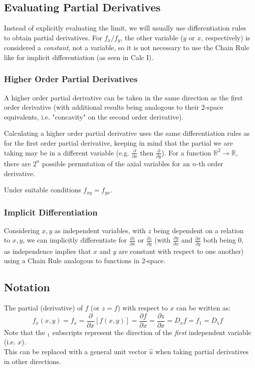 \documentclass{article}
\begin{document}
\subsection{Evaluating Partial Derivatives}
Instead of explicitly evaluating the limit, we will usually use differentiation rules to obtain partial derivatives. For $f_x$/$f_y$, the other variable ($y$ or $x$, respectively) is considered a \emph{constant}, not a variable, so it is not necessary to use the Chain Rule like for implicit differentiation (as seen in Calc I).

\subsubsection{Higher Order Partial Derivatives}
A higher order partial derivative can be taken in the same direction as the first order derivative (with additional results being analogous to their 2-space equivalents, i.e. "concavity" on the second order derivative).

Calculating a higher order partial derivative uses the same differentiation rules as for the first order partial derivative, keeping in mind that the partial we are taking may be in a different variable (e.g. $\frac{\partial}{\partial x}$ then $\frac{\partial}{\partial y}$). For a function $\mathbb{R}^2\to\mathbb{R}$, there are $2^n$ possible permutation of the axial variables for an $n$-th order derivative.

Under suitable conditions $f_{xy} = f_{yx}$.

\subsubsection{Implicit Differentiation}
Considering $x,y$ as independent variables, with $z$ being dependent on a relation to $x,y$, we can implicitly differentiate for $\frac{\partial z}{\partial x}$ or $\frac{\partial z}{\partial y}$ (with $\frac{\partial y}{\partial x}$ and $\frac{\partial x}{\partial y}$ both being $0$, as independence implies that $x$ and $y$ are constant with respect to one another) using a Chain Rule analogous to functions in 2-space.

\subsection{Notation}
The partial (derivative) of $f$ (or $z=f$) with respect to $x$ can be written as:
\[
f_x(x,y)=f_x=\frac{\partial}{\partial x}\left[f(x,y)\right] = \frac{\partial f}{\partial x} = \frac{\partial z}{\partial x}=D_xf=f_1=D_1f
\]
Note that the $_1$ subscripts represent the direction of the \emph{first} independent variable (i.e. $x$).\\
This can be replaced with a general unit vector $\hat{u}$ when taking partial derivatives in other directions.
\end{document}
